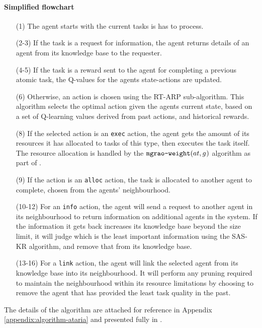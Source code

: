  \paragraph*{Simplified \acronymATARIA{}{} flowchart}
 \begin{enumerate}
	\item[(1)] The agent starts with the current tasks is has to process. 
	\item[(2-3)] If the task is a request for information, the agent returns details of an agent from its knowledge base to the requester. 
	\item[(4-5)] If the task is a reward sent to the agent for completing a previous atomic task, the Q-values for the agents state-actions are updated. 
	\item[(6)] Otherwise, an action is chosen using the RT-ARP sub-algorithm. This algorithm selects the optimal action given the agents current state, based on a set of Q-learning values derived from past actions, and historical rewards. 
	\item[(8)] If the selected action is an \texttt{exec} action, the agent gets the amount of its resources it has allocated to tasks of this type, then executes the task itself. The resource allocation is handled by the $\functionMGRAOWeighting{}{}$ algorithm as part of \acronymMGRAO{}{}. 
	\item[(9)] If the action is an \texttt{alloc} action, the task is allocated to another agent to complete, chosen from the agents' neighbourhood. 
	\item[(10-12)] For an \texttt{info} action, the agent will send a request to another agent in its neighbourhood to return information on additional agents in the system. If the information it gets back increases its knowledge base beyond the size limit, it will judge which is the least important information using the SAS-KR algorithm, and remove that from its knowledge base. 
	\item[(13-16)] For a \texttt{link} action, the agent will link the selected agent from its knowledge base into its neighbourhood. It will perform any pruning required to maintain the neighbourhood within its resource limitations by choosing to remove the agent that has provided the least task quality in the past. 
\end{enumerate}

The details of the algorithm are attached for reference in  Appendix \ref{appendix:algorithm-ataria}  and presented fully in \citep{creech2021dynamic}.


